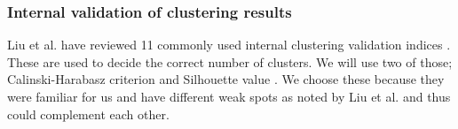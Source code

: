 % 






\subsubsection{Internal validation of clustering results}
Liu et al. have reviewed 11 commonly used internal clustering 
validation indices \cite{liu_understanding_2010}. These are used 
to decide the correct number of clusters. We will use two 
of those; Calinski-Harabasz criterion \cite{calinski_dendrite_1974} 
and Silhouette value \cite{rousseeuw_silhouettes:_1987}. We choose 
these because they were familiar for us and have different
weak spots as noted by Liu et al. and thus could complement each 
other. 

